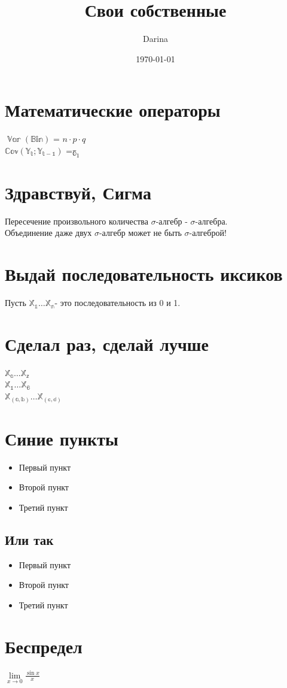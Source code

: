 \documentclass[12pt, a4paper]{article}
\title{Свои собственные}
\date{\today}
\author{Darina}
\newcommand{\bsquare}{\item[\large\color{myblue}\bullet]}
\DeclareMathOperator{\Var}{\ensuremath{\mathbb{Var}}}
\newcommand{\Cov}[2]{\ensuremath{\mathbb{Cov(#1;#2)}}}
\newcommand {\sq} {\ensuremath{\mathbb{X_1 \ldots X_n}}}
\newcommand{\sqq}[2]{\ensuremath{\mathbb{X_{#1} \ldots X_{#2}}}}
\newcommand{\llim}[3]{\ensuremath{\lim\limits_{#1 \to #2} #3}}
\def \Bin{\ensuremath{\mathbb{Bin}}}
\def \Y{\ensuremath{\mathbb{Y}}}
\def \g{\ensuremath{\mathbb{\gamma}}}
\def \s {\ensuremath{\mathbb{\sigma}}}
\begin{document}
\maketitle
\section {Математические операторы}

$\Var (\Bin)$ = $n \cdot p \cdot q$ \\
\Cov{\Y_{t}}{\Y_{t-1}} =$ \g_{1}$

\section {Здравствуй, Сигма}
Пересечение произвольного количества \s-алгебр - \s-алгебра.\\
Объединение даже двух \s-алгебр может не быть \s-алгеброй!

\section {Выдай последовательность иксиков}
 Пусть \sq- это последовательность из 0 и 1. 
 
 \section {Сделал раз, сделай лучше}
 $\sqq{a}{z}$\\
$\sqq{1}{6}$\\
$\sqq{(a,b)}{(c,d)}$
 \newpage

\section {Синие пункты}

\begin{itemize}
  \item Первый пункт
  \item Второй пункт
  \item Третий пункт
\end{itemize}
\subsection {Или так}
\begin{itemize}
  \bsquare{ Первый пункт}
  \bsquare {Второй пункт}
  \bsquare {Третий пункт}
\end{itemize}

\section {Беспредел}
\llim{x}{0} {\frac{\sin{x}}{x}}
\end{document}
